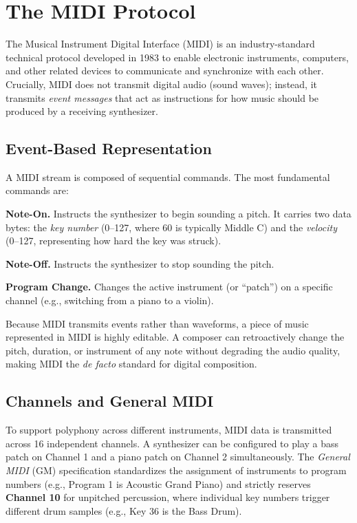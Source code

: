 
\section{The MIDI Protocol}\label{detail-sec:background-midi}

The Musical Instrument Digital Interface (MIDI) is an industry-standard technical protocol developed in 1983 to enable
electronic instruments, computers, and other related devices to communicate and synchronize with each other.
Crucially, MIDI does not transmit digital audio (sound waves); instead, it transmits \textit{event messages} that act as
instructions for how music should be produced by a receiving synthesizer.

\subsection{Event-Based Representation}\label{detail-subsec:event-based-representation}

A MIDI stream is composed of sequential commands.
The most fundamental commands are:

\noindent \textbf{Note-On.} Instructs the synthesizer to begin sounding a pitch.
It carries two data bytes: the \textit{key number} (0--127, where 60 is typically Middle C) and the
\textit{velocity} (0--127, representing how hard the key was struck).

\noindent \textbf{Note-Off.} Instructs the synthesizer to stop sounding the pitch.

\noindent \textbf{Program Change.} Changes the active instrument (or ``patch'') on a specific channel (e.g., switching
from a piano to a violin).

Because MIDI transmits events rather than waveforms, a piece of music represented in MIDI is highly editable.
A composer can retroactively change the pitch, duration, or instrument of any note without degrading the audio quality,
making MIDI the \textit{de facto} standard for digital composition.

\subsection{Channels and General MIDI}\label{detail-subsec:channels-and-general-midi}

To support polyphony across different instruments, MIDI data is transmitted across 16 independent channels.
A synthesizer can be configured to play a bass patch on Channel 1 and a piano patch on Channel 2 simultaneously.
The \textit{General MIDI} (GM) specification standardizes the assignment of instruments to program numbers (e.g.,
Program 1 is Acoustic Grand Piano) and strictly reserves \textbf{Channel 10} for unpitched percussion, where individual
key numbers trigger different drum samples (e.g., Key 36 is the Bass Drum).

